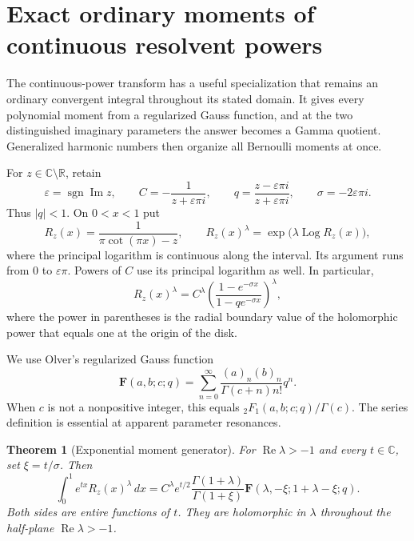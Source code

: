 \documentclass[11pt,a4paper]{article}
\numberwithin{equation}{section}
\newtheorem{theorem}{Theorem}[section]
\theoremstyle{definition}
\theoremstyle{remark}
\begin{document}


\section{Exact ordinary moments of continuous resolvent powers}
\label{moment:sec}

The continuous-power transform has a useful specialization that remains
an ordinary convergent integral throughout its stated domain. It gives
every polynomial moment from a regularized Gauss function, and at the
two distinguished imaginary parameters the answer becomes a Gamma
quotient. Generalized harmonic numbers then organize all Bernoulli
moments at once.

For $z\in\mathbb C\setminus\mathbb R$, retain
\[
 \varepsilon=\operatorname{sgn}\operatorname{Im}z,\qquad
 C=-\frac1{z+\varepsilon\pi i},\qquad
 q=\frac{z-\varepsilon\pi i}{z+\varepsilon\pi i},\qquad
 \sigma=-2\varepsilon\pi i.
\]
Thus $|q|<1$. On $0<x<1$ put
\[
 R_z(x)=\frac1{\pi\cot(\pi x)-z},\qquad
 R_z(x)^\lambda=\exp\bigl(\lambda\operatorname{Log}R_z(x)\bigr),
\]
where the principal logarithm is continuous along the interval. Its
argument runs from $0$ to $\varepsilon\pi$. Powers of $C$ use its
principal logarithm as well. In particular,
\[
 R_z(x)^\lambda=C^\lambda
 \left(\frac{1-e^{-\sigma x}}{1-qe^{-\sigma x}}\right)^\lambda,
\]
where the power in parentheses is the radial boundary value of the
holomorphic power that equals one at the origin of the disk.

We use Olver's regularized Gauss function
\begin{equation}\label{moment:eq:regularized}
 \mathbf F(a,b;c;q)=
 \sum_{n=0}^\infty
 \frac{(a)_n(b)_n}{\Gamma(c+n)n!}q^n.
\end{equation}
When $c$ is not a nonpositive integer, this equals
${}_2F_1(a,b;c;q)/\Gamma(c)$. The series definition is essential at
apparent parameter resonances.

\begin{theorem}[Exponential moment generator]
\label{moment:thm:exponential}
For $\operatorname{Re}\lambda>-1$ and every $t\in\mathbb C$, set
$\xi=t/\sigma$. Then
\begin{equation}\label{moment:eq:exponential}
 \boxed{\displaystyle
 \int_0^1 e^{tx}R_z(x)^\lambda\,dx
 =C^\lambda e^{t/2}
   \frac{\Gamma(1+\lambda)}{\Gamma(1+\xi)}
   \mathbf F(\lambda,-\xi;1+\lambda-\xi;q).}
\end{equation}
Both sides are entire functions of $t$. They are holomorphic in
$\lambda$ throughout the half-plane $\operatorname{Re}\lambda>-1$.
\end{theorem}
\end{document}
